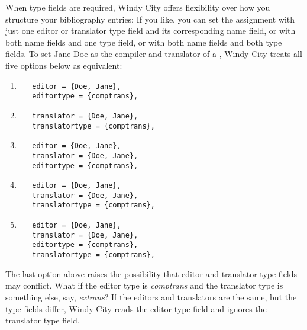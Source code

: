 \documentclass[11pt,letterpaper,oneside]{article}
\begin{document}
When type fields are required, Windy City offers flexibility over how
you structure your bibliography entries: If you like, you can set the
assignment with just one editor or translator type field and its
corresponding name field, or with both name fields and one type field,
or with both name fields and both type fields. To set Jane Doe as the
compiler and translator of a , Windy City treats all
five options below as equivalent:

\begin{enumerate}[itemsep=0.2\baselineskip]

\item

\begin{verbatim}
   editor = {Doe, Jane},
   editortype = {comptrans},
\end{verbatim}

\item

\begin{verbatim}
   translator = {Doe, Jane},
   translatortype = {comptrans},
\end{verbatim}

\item

\begin{verbatim}
   editor = {Doe, Jane},
   translator = {Doe, Jane},
   editortype = {comptrans},
\end{verbatim}

\item

\begin{verbatim}
   editor = {Doe, Jane},
   translator = {Doe, Jane},
   translatortype = {comptrans},
\end{verbatim}

\item

\begin{verbatim}
   editor = {Doe, Jane},
   translator = {Doe, Jane},
   editortype = {comptrans},
   translatortype = {comptrans},
\end{verbatim}

\end{enumerate}

The last option above raises the possibility that editor and
translator type fields may conflict. What if the editor type is
\textit{comptrans} and the translator type is something else, say,
\textit{extrans}? If the editors and translators are the same, but the
type fields differ, Windy City reads the editor type field and ignores
the translator type field.
\end{document}

